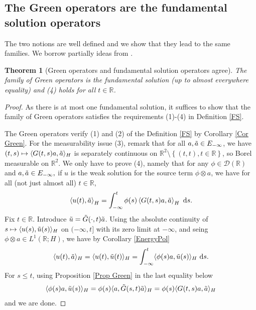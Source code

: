 \documentclass[11pt, letterpaper]{amsart}
\newtheorem{thm}{Theorem}[section]
\theoremstyle{definition}
\theoremstyle{remark}
\numberwithin{equation}{section}
\begin{document}
\subsection{The Green operators are {the} fundamental solution operators} The two notions are well defined and we show that they lead to the same families. We borrow partially ideas from \cite{auscher2023universal}.
\begin{thm}[Green operators and fundamental solution operators agree]\label{thm:identification}
    The family of Green operators is the fundamental solution (up to almost everywhere equality) and (4) holds for all $t\in \mathbb{R}$.
\end{thm}
\begin{proof}
As there is at most one fundamental solution, it suffices to show that the family of Green operators satisfies the requirements (1)-(4) in Definition \ref{FS}.

The Green operators verify (1) and (2) of the Definition \ref{FS} by Corollary \ref{Cor Green}. For the measurability issue (3), remark that for all $a,\Tilde{a} \in E_{-\infty}$, we have $(t,s)\mapsto \langle G(t,s)a, \Tilde{a} \rangle_H$ is separately continuous on $\mathbb{R}^2\setminus \left \{ (t,t), t \in \mathbb{R} \right \}$, so Borel measurable on $\mathbb{R}^2$. We only have to prove (4), namely that for any $\phi \in \mathcal{D}(\mathbb{R})$ and $a,\Tilde{a}\in E_{-\infty},$  if $u$ is the weak solution for the source term $\phi\otimes a$, we have  for  all (not just almost all) $t \in \mathbb{R}$,
\begin{equation}\label{GreenLemma}
        \left\langle u(t), \Tilde{a} \right \rangle_H = \int_{-\infty}^{t}\phi(s)  \left\langle G(t,s)a, \Tilde{a} \right \rangle_H \ \mathrm{d}s.
\end{equation}
Fix $t\in \mathbb{R}$. Introduce $\Tilde{u}=\Tilde{G}(\cdot, t)\Tilde{a}$. Using the absolute continuity of $s\mapsto \langle u(s),\Tilde{u}(s)\rangle_H$ on $(-\infty, t]$ with its zero limit at $-\infty$, and seing $\phi\otimes a \in L^1(\mathbb{R};H)$, we have by Corollary \ref{EnergyPol}  
\begin{equation*}
    \langle u(t),\Tilde{a}\rangle_H= \langle u(t),\Tilde{u}(t)\rangle_H= \int_{-\infty}^t \langle \phi(s) a, \Tilde{u}(s)\rangle_H \ \mathrm ds.
\end{equation*}
For $s\le t$,  using Proposition \ref{Prop Green} in the last equality below
\begin{equation*}
      \langle \phi(s) a, \Tilde{u}(s)\rangle_H =  \phi(s)\langle  a, \Tilde{G}(s,t)\Tilde{a}\rangle_H=  \phi(s)\langle  G(t,s)a, \Tilde{a}\rangle_H
\end{equation*}
and we are done.
\end{proof}
\end{document}
